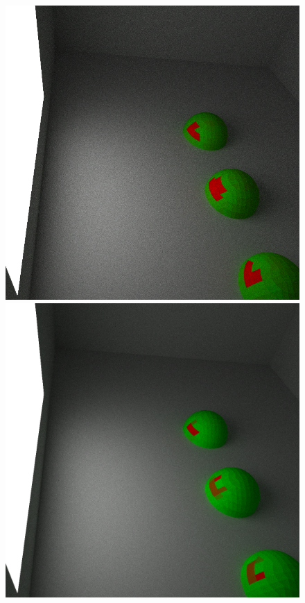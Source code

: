 \documentclass[../dissertation.tex]{subfiles}
\begin{document}
\begin{figure}[h]
\centering
{}
  \includegraphics[width=\textwidth]{images/renders/true_distribution.png}   
  \label{fig:true_incident_distribution}
\endminipage\hspace{1em}
  \includegraphics[width=\textwidth]{images/renders/expected_sarsa_visualisation.png}   

\end{figure}
\end{document}
